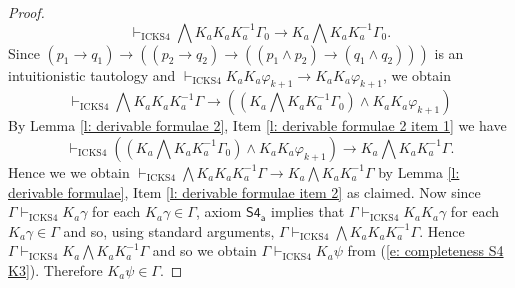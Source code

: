 \documentclass[10pt,a4paper]{amsart}
\newcommand{\K}{K}
\newcommand{\agi}{a}
\newcommand{\hicks}{\mathrm{ICKS4}}
\begin{document}
\begin{proof}
\begin{equation}
       \vdash_\hicks \bigwedge \K_\agi \K_\agi \K_\agi^{-1}\Gamma_0 \rightarrow \K_\agi \bigwedge \K_\agi \K_\agi^{-1} \Gamma_0.
   \end{equation}
   Since $(p_1 \rightarrow q_1) \rightarrow ((p_2 \rightarrow q_2) \rightarrow ((p_1 \wedge p_2) \rightarrow (q_1 \wedge q_2)))$ is an intuitionistic tautology and $\vdash_\hicks \K_\agi \K_\agi \varphi_{k+1} \rightarrow \K_\agi \K_\agi \varphi_{k+1}$, we obtain
   \begin{equation}\label{e: completeness S4 K5}
       \vdash_\hicks \bigwedge \K_\agi \K_\agi \K_\agi^{-1}\Gamma \rightarrow ((\K_\agi \bigwedge \K_\agi \K_\agi^{-1} \Gamma_0) \wedge \K_\agi \K_\agi \varphi_{k+1})
   \end{equation}
 By Lemma \ref{l: derivable formulae 2}, Item \ref{l: derivable formulae 2 item 1} we have
 \begin{equation}\label{e: completeness S4 K6}
     \vdash_\hicks ((\K_\agi \bigwedge \K_\agi \K_\agi^{-1} \Gamma_0) \wedge \K_\agi \K_\agi \varphi_{k+1}) \rightarrow \K_\agi \bigwedge \K_\agi \K_\agi^{-1} \Gamma.
 \end{equation}
 Hence we we obtain $\vdash_\hicks \bigwedge \K_\agi \K_\agi \K_\agi^{-1} \Gamma \rightarrow \K_\agi \bigwedge \K_\agi \K_\agi^{-1} \Gamma$ by Lemma \ref{l: derivable formulae}, Item \ref{l: derivable formulae item 2}  as claimed. Now since $\Gamma \vdash_\hicks \K_\agi \gamma$ for each $\K_\agi \gamma \in \Gamma$, axiom $\mathsf{S4_\agi}$ implies that $\Gamma \vdash_\hicks \K_\agi \K_\agi \gamma$ for each $\K_\agi \gamma \in \Gamma$ and so, using standard arguments, $\Gamma \vdash_\hicks \bigwedge \K_\agi \K_\agi \K_\agi^{-1} \Gamma$. Hence $\Gamma \vdash_\hicks \K_\agi \bigwedge \K_\agi \K_\agi^{-1} \Gamma$ and so we obtain $\Gamma \vdash_\hicks \K_\agi \psi$ from (\ref{e: completeness S4 K3}). Therefore $\K_\agi \psi \in \Gamma$. \smallskip


\end{proof}
\end{document}
